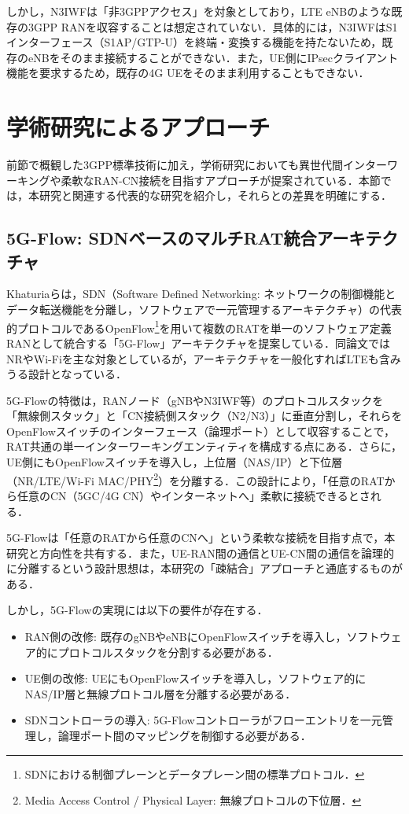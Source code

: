 しかし，N3IWFは「非3GPPアクセス」を対象としており，LTE eNBのような既存の3GPP RANを収容することは想定されていない．具体的には，N3IWFはS1インターフェース（S1AP/GTP-U）を終端・変換する機能を持たないため，既存のeNBをそのまま接続することができない．また，UE側にIPsecクライアント機能を要求するため，既存の4G UEをそのまま利用することもできない．

\section{学術研究によるアプローチ}

前節で概観した3GPP標準技術に加え，学術研究においても異世代間インターワーキングや柔軟なRAN-CN接続を目指すアプローチが提案されている．本節では，本研究と関連する代表的な研究を紹介し，それらとの差異を明確にする．

\subsection{5G-Flow: SDNベースのマルチRAT統合アーキテクチャ}

Khaturiaらは，SDN（Software Defined Networking: ネットワークの制御機能とデータ転送機能を分離し，ソフトウェアで一元管理するアーキテクチャ）の代表的プロトコルであるOpenFlow\footnote{SDNにおける制御プレーンとデータプレーン間の標準プロトコル．}を用いて複数のRATを単一のソフトウェア定義RANとして統合する「5G-Flow」アーキテクチャを提案している\cite{Khaturia2021_5GFlow}．同論文ではNRやWi-Fiを主な対象としているが，アーキテクチャを一般化すればLTEも含みうる設計となっている．

5G-Flowの特徴は，RANノード（gNBやN3IWF等）のプロトコルスタックを「無線側スタック」と「CN接続側スタック（N2/N3）」に垂直分割し，それらをOpenFlowスイッチのインターフェース（論理ポート）として収容することで，RAT共通の単一インターワーキングエンティティを構成する点にある．さらに，UE側にもOpenFlowスイッチを導入し，上位層（NAS/IP）と下位層（NR/LTE/Wi-Fi MAC/PHY\footnote{Media Access Control / Physical Layer: 無線プロトコルの下位層．}）を分離する．この設計により，「任意のRATから任意のCN（5GC/4G CN）やインターネットへ」柔軟に接続できるとされる．

5G-Flowは「任意のRATから任意のCNへ」という柔軟な接続を目指す点で，本研究と方向性を共有する．また，UE-RAN間の通信とUE-CN間の通信を論理的に分離するという設計思想は，本研究の「疎結合」アプローチと通底するものがある．

しかし，5G-Flowの実現には以下の要件が存在する．
\begin{itemize}
    \item RAN側の改修: 既存のgNBやeNBにOpenFlowスイッチを導入し，ソフトウェア的にプロトコルスタックを分割する必要がある．
    \item UE側の改修: UEにもOpenFlowスイッチを導入し，ソフトウェア的にNAS/IP層と無線プロトコル層を分離する必要がある．
    \item SDNコントローラの導入: 5G-Flowコントローラがフローエントリを一元管理し，論理ポート間のマッピングを制御する必要がある．
\end{itemize}

